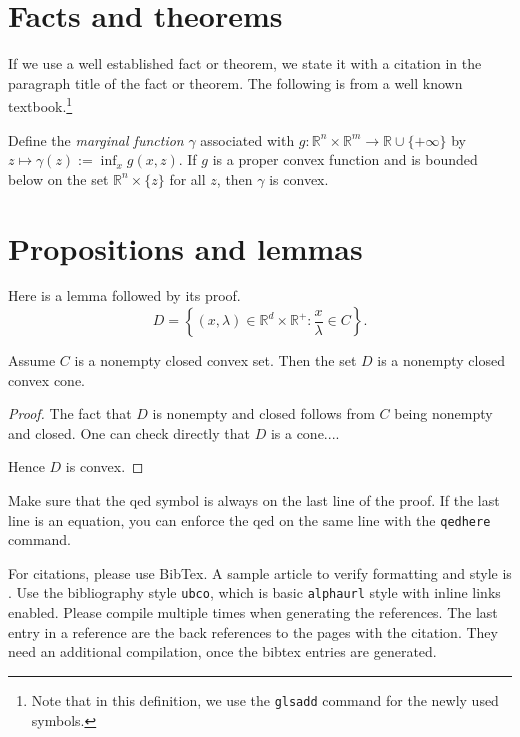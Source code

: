 \documentclass[msc,oneside]{ubcthesis}%
\newcommand{\R}{\mathbb{R}}   %
\begin{document}
\section{Facts and theorems}
If we use a well established fact or theorem, we state it with a citation in the paragraph title of the fact or theorem. The following is from a well known textbook.\footnote{Note that in this definition, we use the \texttt{glsadd} command for the newly used symbols.}

\begin{fact}\cite[Theorem~IV.2.4.2]{Hiriart-Urruty:1993-ConvexAnalysis}\label{def:marginalfunc}
Define the \emph{marginal function} $\gamma$ associated with $g:\R^n\times\R^m\rightarrow \R\cup
\{+\infty\}$ by $z\mapsto \gamma(z):=\inf_x
g(x,z)$. If $g$ is a proper convex function and is bounded below on the set  $\R^n \times \{z\}$ for all $z$, then $\gamma$ is convex.
\end{fact}

\section{Propositions and lemmas}
Here is a lemma followed by its proof.
\[
D =\left\{ (x,\lambda)\in \R^d \times \R^+ : \frac{x}{\lambda} \in C\right\}.
\]


\begin{lemma}
Assume $C$ is a nonempty closed convex set. Then the set $D$ is a nonempty closed convex cone.
\end{lemma}

\begin{proof}
The fact that $D$ is nonempty and closed follows from $C$ being non\-empty and closed. One can check directly that $D$ is a cone....

Hence $D$ is convex.
\end{proof}
Make sure that the qed symbol is always on the last line of the proof. If the last line is an equation, you can enforce the qed on the same line with the \texttt{qedhere} command.

For citations, please use BibTex. A sample article to verify formatting and style is \cite{Bauschke:2007-PA02}. Use the bibliography style \texttt{ubco}, which is basic \texttt{alphaurl} style with inline links enabled. Please compile multiple times when generating the references. The last entry in a reference are the back references to the pages with the citation. They need an additional compilation, once the bibtex entries are generated.
\end{document}
